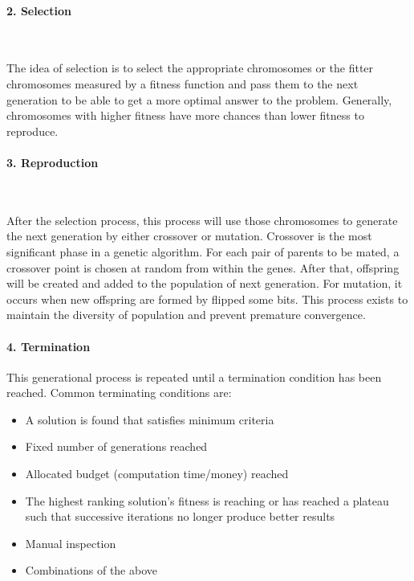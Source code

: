 \documentclass[12pt,oneside,openright,a4paper]{cpe-english-project}
\begin{document}
\paragraph*{2. Selection}\

The idea of selection is to select the appropriate chromosomes or the fitter chromosomes measured by a fitness function and pass them to the next generation to be able to get a more optimal answer to the problem. Generally, chromosomes with higher fitness have more chances than lower fitness to reproduce.

\paragraph*{3. Reproduction}\

After the selection process, this process will use those chromosomes to generate the next generation by either crossover or mutation. Crossover is the most significant phase in a genetic algorithm. For each pair of parents to be mated, a crossover point is chosen at random from within the genes. \cite{IntroductiontoGeneticAlgorithmsIncludingExampleCode} After that, offspring will be created and added to the population of next generation. For mutation, it occurs when new offspring are formed by flipped some bits. This process exists to maintain the diversity of population and prevent premature convergence.

\paragraph*{4. Termination}\cite{Geneticalgorithm}

This generational process is repeated until a termination condition has been reached. Common terminating conditions are:

\begin{itemize}
\item A solution is found that satisfies minimum criteria
\item Fixed number of generations reached
\item Allocated budget (computation time/money) reached
\item The highest ranking solution's fitness is reaching or has reached a plateau such that successive iterations no longer produce better results
\item Manual inspection
\item Combinations of the above
\end{itemize}
\end{document}
